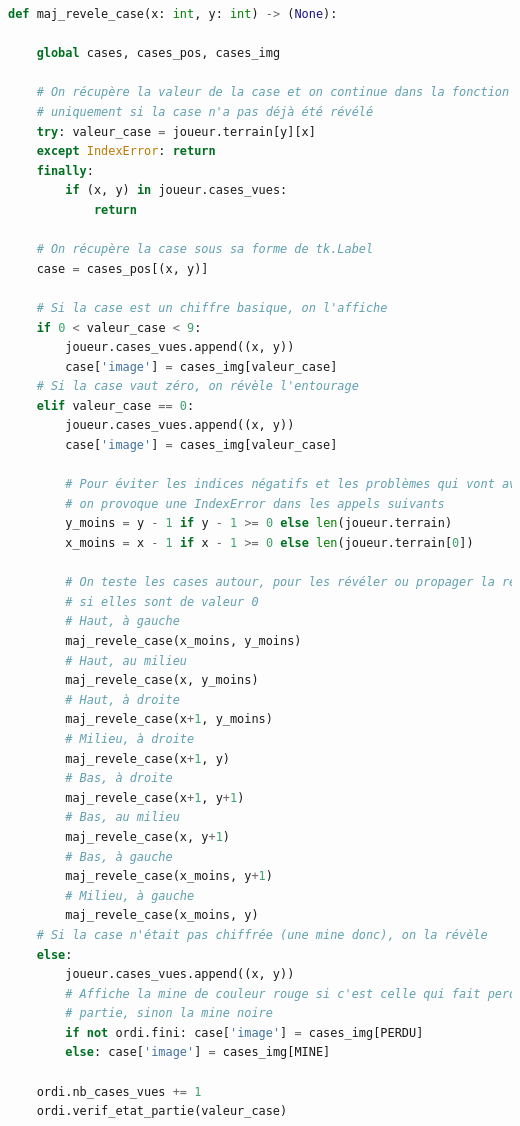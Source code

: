 \documentclass[12pt, a4paper]{article}
\begin{document}
\newpage

\begin{lstlisting}[language=Python, caption=Fonction \emph{maj\_revele\_case}]
def maj_revele_case(x: int, y: int) -> (None):

    global cases, cases_pos, cases_img

    # On récupère la valeur de la case et on continue dans la fonction
    # uniquement si la case n'a pas déjà été révélé
    try: valeur_case = joueur.terrain[y][x]
    except IndexError: return
    finally:
        if (x, y) in joueur.cases_vues:
            return

    # On récupère la case sous sa forme de tk.Label
    case = cases_pos[(x, y)]

    # Si la case est un chiffre basique, on l'affiche
    if 0 < valeur_case < 9:
        joueur.cases_vues.append((x, y))
        case['image'] = cases_img[valeur_case]
    # Si la case vaut zéro, on révèle l'entourage
    elif valeur_case == 0:
        joueur.cases_vues.append((x, y))
        case['image'] = cases_img[valeur_case]

        # Pour éviter les indices négatifs et les problèmes qui vont avec,
        # on provoque une IndexError dans les appels suivants
        y_moins = y - 1 if y - 1 >= 0 else len(joueur.terrain)
        x_moins = x - 1 if x - 1 >= 0 else len(joueur.terrain[0])

        # On teste les cases autour, pour les révéler ou propager la révélation
        # si elles sont de valeur 0
        # Haut, à gauche
        maj_revele_case(x_moins, y_moins)
        # Haut, au milieu
        maj_revele_case(x, y_moins)
        # Haut, à droite
        maj_revele_case(x+1, y_moins)
        # Milieu, à droite
        maj_revele_case(x+1, y)
        # Bas, à droite
        maj_revele_case(x+1, y+1)
        # Bas, au milieu
        maj_revele_case(x, y+1)
        # Bas, à gauche
        maj_revele_case(x_moins, y+1)
        # Milieu, à gauche
        maj_revele_case(x_moins, y)
    # Si la case n'était pas chiffrée (une mine donc), on la révèle
    else:
        joueur.cases_vues.append((x, y))
        # Affiche la mine de couleur rouge si c'est celle qui fait perdre la
        # partie, sinon la mine noire
        if not ordi.fini: case['image'] = cases_img[PERDU]
        else: case['image'] = cases_img[MINE]

    ordi.nb_cases_vues += 1
    ordi.verif_etat_partie(valeur_case)
\end{lstlisting}


\end{document}
